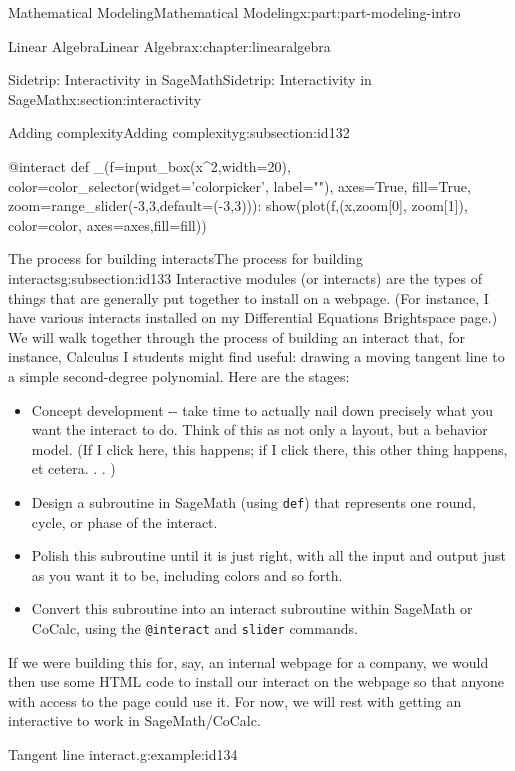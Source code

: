 \documentclass[oneside,10pt,]{book}
\newcommand{\mono}[1]{\texttt{#1}}
\numberwithin{equation}{section}
\begin{document}
\begin{partptx}{Mathematical Modeling}{}{Mathematical Modeling}{}{}{x:part:part-modeling-intro}
\begin{chapterptx}{Linear Algebra}{}{Linear Algebra}{}{}{x:chapter:linearalgebra}
\begin{sectionptx}{Sidetrip: Interactivity in SageMath}{}{Sidetrip: Interactivity in SageMath}{}{}{x:section:interactivity}
\begin{subsectionptx}{Adding complexity}{}{Adding complexity}{}{}{g:subsection:id132}
\begin{itemize}[label=\textbullet]
\end{itemize}
\begin{sageinput}
@interact
def _(f=input_box(x^2,width=20),
     color=color_selector(widget='colorpicker', label=""),
     axes=True,
     fill=True,
     zoom=range_slider(-3,3,default=(-3,3))):
    show(plot(f,(x,zoom[0], zoom[1]), color=color, axes=axes,fill=fill))
\end{sageinput}
\end{subsectionptx}
%
%
\typeout{************************************************}
\typeout{************************************************}
%
\begin{subsectionptx}{The process for building interacts}{}{The process for building interacts}{}{}{g:subsection:id133}
Interactive modules (or interacts) are the types of things that are generally put together to install on a webpage. (For instance, I have various interacts installed on my Differential Equations Brightspace page.) We will walk together through the process of building an interact that, for instance, Calculus I students might find useful: drawing a moving tangent line to a simple second-degree polynomial. Here are the stages:%
%
\begin{itemize}[label=\textbullet]
\item{}Concept development -{}-{} take time to actually nail down precisely what you want the interact to do. Think of this as not only a layout, but a behavior model. (If I click here, this happens; if I click there, this other thing happens, et cetera. . . )%
\item{}Design a subroutine in SageMath (using \mono{def}) that represents one round, cycle, or phase of the interact.%
\item{}Polish this subroutine until it is just right, with all the input and output just as you want it to be, including colors and so forth.%
\item{}Convert this subroutine into an interact subroutine within SageMath or CoCalc, using the \mono{@interact} and \mono{slider} commands.%
\end{itemize}
If we were building this for, say, an internal webpage for a company, we would then use some HTML code to install our interact on the webpage so that anyone with access to the page could use it. For now, we will rest with getting an interactive to work in SageMath\slash{}CoCalc.%
\end{subsectionptx}
\begin{example}{Tangent line interact.}{g:example:id134}%

\end{example}
\end{sectionptx}
\end{chapterptx}
\end{partptx}
\end{document}
